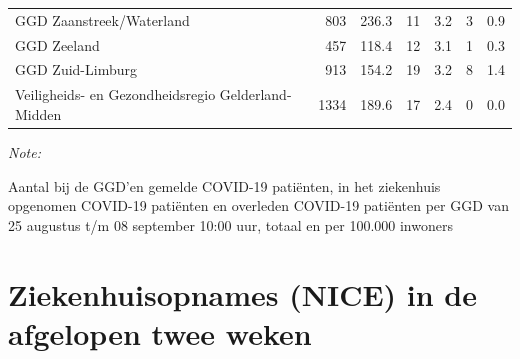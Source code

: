 \documentclass[
  english,
  man,floatsintext]{apa6}
\begin{document}
\begin{table}
\begin{threeparttable}
\begin{tabular}{lrrrrrr}
GGD Zaanstreek/Waterland & 803 & 236.3 & 11 & 3.2 & 3 & 0.9\\
GGD Zeeland & 457 & 118.4 & 12 & 3.1 & 1 & 0.3\\
GGD Zuid-Limburg & 913 & 154.2 & 19 & 3.2 & 8 & 1.4\\
Veiligheids- en Gezondheidsregio Gelderland-Midden & 1334 & 189.6 & 17 & 2.4 & 0 & 0.0\\
\bottomrule
\end{tabular}
\begin{tablenotes}
\item \textit{Note: } 
\item Aantal bij de GGD’en gemelde COVID-19 patiënten, in het ziekenhuis opgenomen COVID-19 patiënten en overleden COVID-19 patiënten per GGD van 25 augustus t/m 08 september 10:00 uur, totaal en per 100.000 inwoners
\end{tablenotes}
\end{threeparttable}
\endgroup{}
\end{table}

\newpage

\hypertarget{ziekenhuisopnames-nice-in-de-afgelopen-twee-weken}{%
\section{Ziekenhuisopnames (NICE) in de afgelopen twee weken}\label{ziekenhuisopnames-nice-in-de-afgelopen-twee-weken}}
\end{document}
